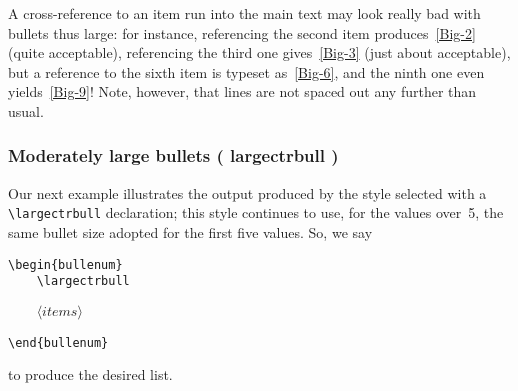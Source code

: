 \documentclass[a4paper]{article}
\DeclareRobustCommand*{\command}[1]{%
	{\texorpdfstring{\normalfont\ttfamily \char\escapechar}{\pdfbslash}#1}%
}
\DeclareRobustCommand*{\meta}[1]{\mbox{\(\langle\textit{#1}\rangle\)}}
\newcommand*{\pdfbslash}{}
{\catcode`\|=0 |catcode`|\=12 |gdef|pdfbslash{\\}}
\begin{document}
A cross-reference to an item run into the main text may look really
bad with bullets thus large: for instance, referencing the second item
produces~\ref{Big-2} (quite acceptable), referencing the third one
gives~\ref{Big-3} (just about acceptable), but a reference to the
sixth item is typeset as~\ref{Big-6}, and the ninth one even
yields~\ref{Big-9}!  Note, however, that lines are not spaced out any
further than usual.



\subsubsection{Moderately large bullets (\command{largectrbull})}
\label{SSS:Xmp-Large}

Our next example illustrates the output produced by the style selected
with a \verb|\largectrbull| declaration; this style continues to use,
for the values over~5, the same bullet size adopted for the first five
values.  So, we say
%
\begin{verbatim}
\begin{bullenum}
    \largectrbull
\end{verbatim}
\begin{flushleft}
	\texttt{\ \ \ \ }\meta{items}
\end{flushleft}
\begin{verbatim}
\end{bullenum}
\end{verbatim}
%
to produce the desired list.
\end{document}
